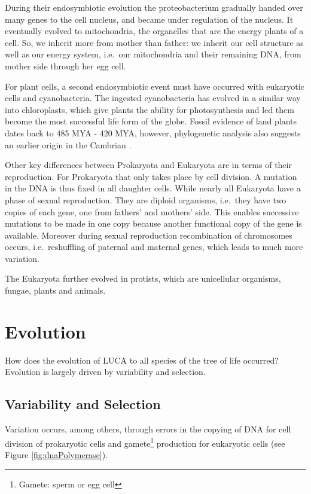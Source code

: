 \documentclass[
  11pt,
]{book}
\begin{document}
During their endosymbiotic evolution the proteobacterium gradually handed over many genes to the cell nucleus, and became under regulation of the nucleus. It eventually evolved to mitochondria, the organelles that are the energy plants of a cell. So, we inherit more from mother than father: we inherit our cell structure as well as our energy system, i.e.~our mitochondria and their remaining DNA, from mother side through her egg cell.

For plant cells, a second endosymbiotic event must have occurred with eukaryotic cells and cyanobacteria. The ingested cyanobacteria has evolved in a similar way into chloroplasts, which give plants the ability for photosynthesis and led them become the most successful life form of the globe. Fossil evidence of land plants dates back to 485 MYA - 420 MYA, however, phylogenetic analysis also suggests an earlier origin in the Cambrian \citep{StrotherFoster2021}.

Other key differences between Prokaryota and Eukaryota are in terms of their reproduction.
For Prokaryota that only takes place by cell division. A mutation in the DNA is thus fixed in all daughter cells. While nearly all Eukaryota have a phase of sexual reproduction. They are diploid organisms, i.e.~they have two copies of each gene, one from fathers' and mothers' side. This enables successive mutations to be made in one copy because another functional copy of the gene is available. Moreover during sexual reproduction recombination of chromosomes occurs, i.e.~reshuffling of paternal and maternal genes, which leads to much more variation.

The Eukaryota further evolved in protists, which are unicellular organisms, fungae, plants and animals.

\hypertarget{evolution}{%
\section{Evolution}\label{evolution}}

How does the evolution of LUCA to all species of the tree of life occurred?
Evolution is largely driven by variability and selection.

\hypertarget{variability-and-selection}{%
\subsection{Variability and Selection}\label{variability-and-selection}}

Variation occurs, among others, through errors in the copying of DNA for cell division of prokaryotic cells and gamete\footnote{Gamete: sperm or egg cell} production for eukaryotic cells (see Figure \ref{fig:dnaPolymerase}).
\end{document}
